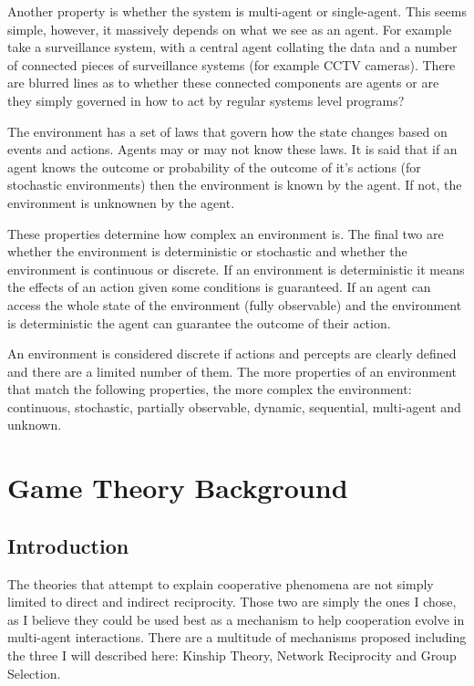 \documentclass[]{final_report}
\begin{document}
Another property is whether the system is multi-agent or single-agent. This seems simple, however, it massively depends on what we see as an agent. For example take a surveillance system, with a central agent collating the data and a number of connected pieces of surveillance systems (for example CCTV cameras). There are blurred lines as to whether these connected components are agents or are they simply governed in how to act by regular systems level programs?\par 
The environment has a set of laws that govern how the state changes based on events and actions. Agents may or may not know these laws. It is said that if an agent knows the outcome or probability of the outcome of it's actions (for stochastic environments) then the environment is known by the agent. If not, the environment is unknownen by the agent.\par 
These properties determine how complex an environment is. The final two are whether the environment is deterministic or stochastic and whether the environment is continuous or discrete. If an environment is deterministic it means the effects of an action given some conditions is guaranteed. If an agent can access the whole state of the environment (fully observable) and the environment is deterministic the agent can guarantee the outcome of their action.\par 
An environment is considered discrete if actions and percepts are clearly defined and there are a limited number of them. The more properties of an environment that match the following properties, the more complex the environment: continuous, stochastic, partially observable, dynamic, sequential, multi-agent and unknown.
\section{Game Theory Background}
\subsection{Introduction}
The theories that attempt to explain cooperative phenomena are not simply limited to direct and indirect reciprocity. Those two are simply the ones I chose, as I believe they could be used best as a mechanism to help cooperation evolve in multi-agent interactions. There are a multitude of mechanisms proposed including the three I will described here: Kinship Theory, Network Reciprocity and Group Selection.
\end{document}
